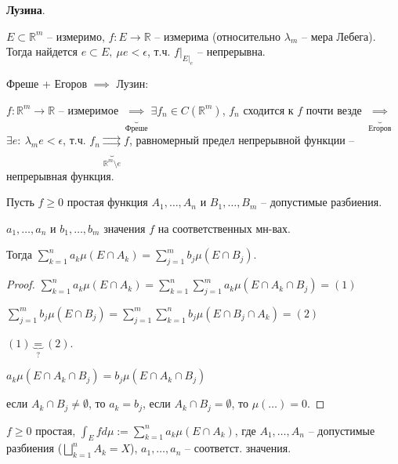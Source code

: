\begin{theorem}
    \textbf{Лузина}.

    $E \subset \mathbb{R}^m$ -- измеримо, $f: E \rightarrow \mathbb{R}$  -- измерима (относительно $\lambda_m$ -- мера Лебега). Тогда найдется $e \subset E, \ \mu e < \epsilon$, т.ч. $f|_{E|_e}$ -- непрерывна.


    Фреше + Егоров $\implies$ Лузин:

    $f: \mathbb{R}^m \rightarrow \mathbb{R}$ -- измеримое $\underbrace{\implies}_{\text{Фреше}} \exists f_n \in C(\mathbb{R}^m)$, $f_n$ сходится к $f$ почти везде $\underbrace{\implies}_{\text{Егоров}}$ $\exists e: \ \lambda_m e < \epsilon$, т.ч. $f_n \underbrace{\rightrightarrows}_{\mathbb{R}^m \setminus e} f$, равномерный предел непрерывной функции -- непрерывная функция.
\end{theorem}




\begin{lemma}
    Пусть $f \geq 0$ простая функция $A_1, \dots, A_n$ и $B_1, \dots, B_m$ -- допустимые разбиения.

    $a_1, \dots, a_n$ и $b_1, \dots, b_m$ значения $f$ на соответственных мн-вах.

    Тогда $\sum_{k=1}^{n} a_k \mu (E \cap A_k) = \sum_{j=1}^{m} b_j \mu (E \cap B_j)$.
\end{lemma}

\begin{proof}
    $\sum_{k=1}^{n} a_k \mu (E \cap A_k) = \sum_{k=1}^{n} \sum_{j=1}^{m} a_k \mu (E \cap A_k \cap B_j) = (1)$

    $\sum_{j=1}^{m} b_j \mu (E \cap B_j) = \sum_{j=1}^{m} \sum_{k=1}^{n} b_j \mu (E \cap B_j \cap A_k) = (2)$

    $(1) \underbrace{=}_{?} (2)$.

    $a_k \mu (E \cap A_k \cap B_j) = b_j \mu (E \cap A_k \cap B_j)$

    если $A_k \cap B_j \not = \emptyset$, то $a_k = b_j$, если $A_k \cap B_j = \emptyset$, то $\mu (\dots) = 0$.
\end{proof}

\begin{definition}
    $f \geq 0$ простая, $\int_{E} f d \mu := \sum_{k=1}^{n} a_k \mu (E \cap A_k)$, где $A_1, \dots , A_n$ -- допустимые разбиения ($\bigsqcup_{k=1}^{n} A_k = X$), $a_1, \dots, a_n$ -- соответст. значения.
\end{definition}

